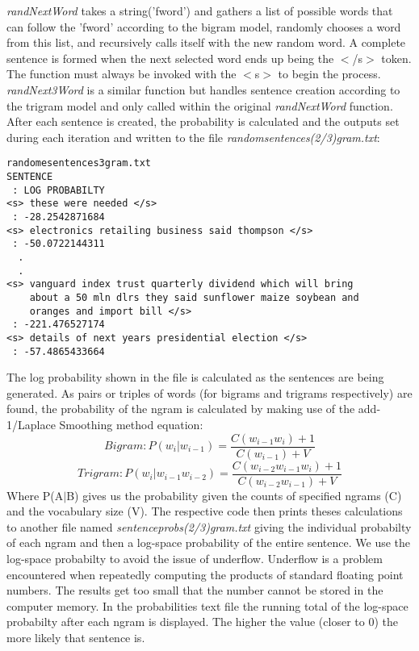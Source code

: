 \documentclass{article}
\begin{document}
\textit{randNextWord }takes a string('fword') and gathers a list of possible words that can follow the 'fword' according to the bigram model, randomly chooses a word from this list, and recursively calls itself with the new random word. A complete sentence is formed when the next selected word ends up being the $<$/s$>$ token. The function must always be invoked with the $<$s$>$ to begin the process. \textit{randNext3Word} is a similar function but handles sentence creation according to the trigram model and only called within the original \textit{randNextWord} function. After each sentence is created, the probability is calculated and the outputs set during each iteration and written to the file \textit{randomsentences(2/3)gram.txt}:
\begin{verbatim}
randomesentences3gram.txt
SENTENCE
 : LOG PROBABILTY
<s> these were needed </s>
 : -28.2542871684
<s> electronics retailing business said thompson </s>
 : -50.0722144311
  .
  .
<s> vanguard index trust quarterly dividend which will bring 
    about a 50 mln dlrs they said sunflower maize soybean and 
    oranges and import bill </s>
 : -221.476527174
<s> details of next years presidential election </s>
 : -57.4865433664 
\end{verbatim}
The log probability shown in the file is calculated as the sentences are being generated. As pairs or triples of words (for bigrams and trigrams respectively) are found, the probability of the ngram is calculated by making use of the add-1/Laplace Smoothing method equation:
\begin{equation}
Bigram : P(w_{i}|w_{i-1}) = \frac{C(w_{i-1}w_{i})+1}{C(w_{i-1})+V}
\end{equation}
\begin{equation}
Trigram : P(w_{i}|w_{i-1}w_{i-2}) = \frac{C(w_{i-2}w_{i-1}w_{i})+1}{C(w_{i-2}w_{i-1})+V}
\end{equation}
Where P(A$|$B) gives us the probability given the counts of specified ngrams (C) and the vocabulary size (V). The respective code then prints theses calculations to another file named \textit{sentenceprobs(2/3)gram.txt} giving the individual probabilty of each ngram and then a log-space probability of the entire sentence. We use the log-space probabilty to avoid the issue of underflow. Underflow is a problem encountered when repeatedly computing the products of standard floating point numbers. The results get too small that the number cannot be stored in the computer memory. In the probabilities text file the running total of the log-space probabilty after each ngram is displayed. The higher the value (closer to 0) the more likely that sentence is.
\end{document}
